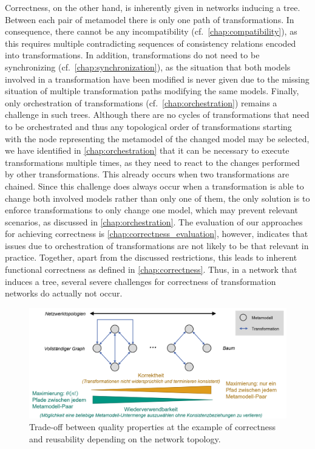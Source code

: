 Correctness, on the other hand, is inherently given in networks inducing a tree.
Between each pair of metamodel there is only one path of transformations.
In consequence, there cannot be any incompatibility (cf.\ \autoref{chap:compatibility}), as this requires multiple contradicting sequences of consistency relations encoded into transformations.
In addition, transformations do not need to be synchronizing (cf.\ \autoref{chap:synchronization}), as the situation that both models involved in a transformation have been modified is never given due to the missing situation of multiple transformation paths modifying the same models.
Finally, only orchestration of transformations (cf.\ \autoref{chap:orchestration}) remains a challenge in such trees.
Although there are no cycles of transformations that need to be orchestrated and thus any topological order of transformations starting with the node representing the metamodel of the changed model may be selected, we have identified in \autoref{chap:orchestration} that it can be necessary to execute transformations multiple times, as they need to react to the changes performed by other transformations.
This already occurs when two transformations are chained.
Since this challenge does always occur when a transformation is able to change both involved models rather than only one of them, the only solution is to enforce transformations to only change one model, which may prevent relevant scenarios, as discussed in \autoref{chap:orchestration}.
The evaluation of our approaches for achieving correctness is \autoref{chap:correctness_evaluation}, however, indicates that issues due to orchestration of transformations are not likely to be that relevant in practice.
Together, apart from the discussed restrictions, this leads to inherent functional correctness as defined in \autoref{chap:correctness}.
Thus, in a network that induces a tree, several severe challenges for correctness of transformation networks do actually not occur.

\begin{figure}
    \centering
    \includegraphics[width=\textwidth]{figures/quality/classification/tradeoff.png}
    \caption[Trade-off between correctness and reusability]{Trade-off between quality properties at the example of correctness and reusability depending on the network topology.}
    \label{fig:classification:tradeoff}
\end{figure}

